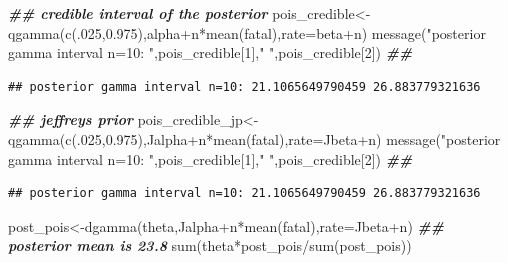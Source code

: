 \documentclass[
]{book}
\newenvironment{Shaded}{\begin{snugshade}}{\end{snugshade}}
\newcommand{\AttributeTok}[1]{\textcolor[rgb]{0.77,0.63,0.00}{#1}}
\newcommand{\DecValTok}[1]{\textcolor[rgb]{0.00,0.00,0.81}{#1}}
\newcommand{\DocumentationTok}[1]{\textcolor[rgb]{0.56,0.35,0.01}{\textbf{\textit{#1}}}}
\newcommand{\FloatTok}[1]{\textcolor[rgb]{0.00,0.00,0.81}{#1}}
\newcommand{\FunctionTok}[1]{\textcolor[rgb]{0.00,0.00,0.00}{#1}}
\newcommand{\NormalTok}[1]{#1}
\newcommand{\OtherTok}[1]{\textcolor[rgb]{0.56,0.35,0.01}{#1}}
\newcommand{\SpecialCharTok}[1]{\textcolor[rgb]{0.00,0.00,0.00}{#1}}
\newcommand{\StringTok}[1]{\textcolor[rgb]{0.31,0.60,0.02}{#1}}
\theoremstyle{definition}
\theoremstyle{definition}
\theoremstyle{definition}
\theoremstyle{definition}
\theoremstyle{remark}
\begin{document}
\begin{Shaded}
\begin{Highlighting}[]
 \DocumentationTok{\#\# credible interval of the posterior}
\NormalTok{ pois\_credible}\OtherTok{\textless{}{-}}\FunctionTok{qgamma}\NormalTok{(}\FunctionTok{c}\NormalTok{(.}\DecValTok{025}\NormalTok{,}\FloatTok{0.975}\NormalTok{),alpha}\SpecialCharTok{+}\NormalTok{n}\SpecialCharTok{*}\FunctionTok{mean}\NormalTok{(fatal),}\AttributeTok{rate=}\NormalTok{beta}\SpecialCharTok{+}\NormalTok{n)}
 \FunctionTok{message}\NormalTok{(}\StringTok{"posterior gamma interval n=10: "}\NormalTok{,pois\_credible[}\DecValTok{1}\NormalTok{],}\StringTok{" "}\NormalTok{,pois\_credible[}\DecValTok{2}\NormalTok{]) }\DocumentationTok{\#\# }
\end{Highlighting}
\end{Shaded}

\begin{verbatim}
## posterior gamma interval n=10: 21.1065649790459 26.883779321636
\end{verbatim}

\begin{Shaded}
\begin{Highlighting}[]
 \DocumentationTok{\#\# jeffrey\textquotesingle{}s prior}
\NormalTok{  pois\_credible\_jp}\OtherTok{\textless{}{-}}\FunctionTok{qgamma}\NormalTok{(}\FunctionTok{c}\NormalTok{(.}\DecValTok{025}\NormalTok{,}\FloatTok{0.975}\NormalTok{),Jalpha}\SpecialCharTok{+}\NormalTok{n}\SpecialCharTok{*}\FunctionTok{mean}\NormalTok{(fatal),}\AttributeTok{rate=}\NormalTok{Jbeta}\SpecialCharTok{+}\NormalTok{n)}
 \FunctionTok{message}\NormalTok{(}\StringTok{"posterior gamma interval n=10: "}\NormalTok{,pois\_credible[}\DecValTok{1}\NormalTok{],}\StringTok{" "}\NormalTok{,pois\_credible[}\DecValTok{2}\NormalTok{]) }\DocumentationTok{\#\# }
\end{Highlighting}
\end{Shaded}

\begin{verbatim}
## posterior gamma interval n=10: 21.1065649790459 26.883779321636
\end{verbatim}

\begin{Shaded}
\begin{Highlighting}[]
\NormalTok{ post\_pois}\OtherTok{\textless{}{-}}\FunctionTok{dgamma}\NormalTok{(theta,Jalpha}\SpecialCharTok{+}\NormalTok{n}\SpecialCharTok{*}\FunctionTok{mean}\NormalTok{(fatal),}\AttributeTok{rate=}\NormalTok{Jbeta}\SpecialCharTok{+}\NormalTok{n)}
  \DocumentationTok{\#\# posterior mean is 23.8}
 \FunctionTok{sum}\NormalTok{(theta}\SpecialCharTok{*}\NormalTok{post\_pois}\SpecialCharTok{/}\FunctionTok{sum}\NormalTok{(post\_pois))}
\end{Highlighting}
\end{Shaded}
\end{document}
